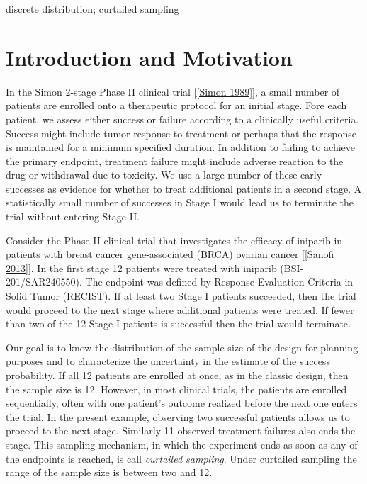 \documentclass[12pt]{article}         %
\begin{document}
\bigskip

  discrete distribution; curtailed sampling


\thispagestyle{empty}
\setcounter{page}{1}

\section            {Introduction and Motivation}


In the Simon 2-stage Phase II clinical trial [\ref{Simon 1989}], a small 
number of patients are enrolled onto a therapeutic 
protocol for an initial stage. Fore each patient, we assess either success 
or failure according to a 
clinically useful criteria. Success might include tumor response to treatment
or perhaps that the response is maintained for a minimum specified duration.
In addition to failing to achieve the primary endpoint, treatment failure 
might include adverse reaction to the drug or withdrawal due to toxicity. We 
use a large number of these early successes as evidence for whether to treat
additional patients in a second stage. A statistically small number of 
successes in Stage I would lead us to terminate the trial without entering 
Stage II.

Consider the Phase II clinical trial that investigates the efficacy of 
iniparib in patients with breast cancer gene-associated (BRCA) ovarian 
cancer [\ref{Sanofi 2013}]. In the first stage 12 patients were treated with 
iniparib (BSI-201/SAR240550). The endpoint was defined by Response Evaluation 
Criteria in Solid Tumor (RECIST). If at least two Stage I patients succeeded,
then the trial would proceed to the next stage where additional patients were 
treated. If fewer than two of the 12 Stage I patients is successful then 
the trial would terminate. 

Our goal is to know the distribution of the sample size of the design for 
planning purposes and to characterize the uncertainty in the estimate of the
success probability.  If all 12 patients are enrolled at once, 
as in the classic 
design, then the sample size is 12. However, in most clinical trials, the 
patients are enrolled sequentially, often with one patient's outcome realized 
before the next one enters the trial. In the present example, observing two 
successful patients allows us to proceed to the next stage. Similarly 11 
observed treatment failures also ends the stage. This sampling mechanism, in 
which the experiment ends as soon as any of the endpoints is reached, is 
call {\em curtailed sampling}. Under curtailed sampling the range of the 
sample size is between two and 12.
\end{document}
